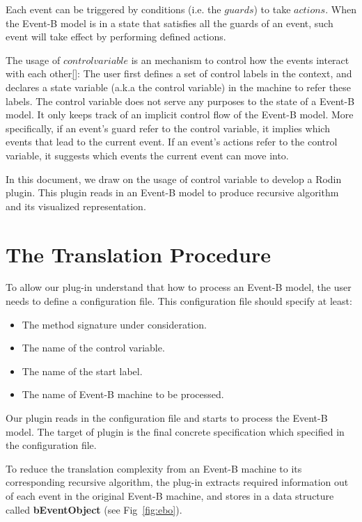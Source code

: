 \documentclass{easychair}
\begin{document}
Each event can be triggered by conditions (i.e. the $guards$) to take $actions$. When the Event-B model is in a state that satisfies all the guards of an event, such event will take effect by performing defined actions.

The usage of $control variable$ is an mechanism to control how the events interact with each other\ref{}: The user first defines a set of control labels in the context, and declares a state variable (a.k.a the control variable) in the machine to refer these labels. The control variable does not serve any purposes to the state of a Event-B model. It only keeps track of an implicit control flow of the Event-B model. More specifically, if an event's guard refer to the control variable, it implies which events that lead to the current event. If an event's actions refer to the control variable, it suggests which events the current event can move into. 

In this document, we draw on the usage of control variable to develop a Rodin plugin. This plugin reads in an Event-B model to produce recursive algorithm and its visualized representation.
 
\section{The Translation Procedure}\label{sect:tp}
To allow our plug-in understand that how to process an Event-B model, the user needs to define a configuration file. This configuration file should specify at least:
\begin{itemize}
	\item The method signature under consideration.
	\item The name of the control variable.
	\item The name of the start label.
	\item The name of Event-B machine to be processed.
\end{itemize}

Our plugin reads in the configuration file and starts to process the Event-B model. The target of plugin is the final concrete specification which specified in the configuration file.

To reduce the translation complexity from an Event-B machine to its corresponding recursive algorithm, the plug-in extracts required information out of each event in the original Event-B machine, and stores in a data structure called \textbf{bEventObject} (see Fig~\ref{fig:ebo}). 
\end{document}
